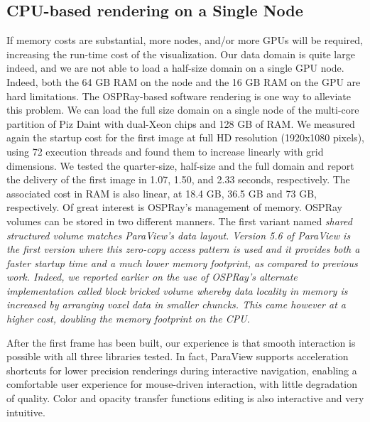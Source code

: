 \documentclass[5p,times]{elsarticle}
\begin{document}
\subsection{CPU-based rendering on a Single Node}
If memory costs are substantial, more nodes, and/or more GPUs will be required,
increasing the run-time cost of the visualization. Our data domain is quite large
indeed, and we are not able to load a half-size domain on a single GPU node. Indeed, both
the 64 GB RAM on the node and the 16 GB RAM on the GPU are hard limitations.
The OSPRay-based software rendering is one way to alleviate this problem. We can load the full size
domain on a single node of  the multi-core partition of Piz Daint with dual-Xeon
chips and 128 GB of RAM. We measured again the startup cost for the first image
at full HD resolution (1920x1080 pixels),
using 72 execution threads and found them to increase linearly with grid dimensions.
We tested the quarter-size, half-size and the full domain and report the delivery
of the first image in 1.07, 1.50, and 2.33 seconds, respectively. The associated cost
in RAM is also linear, at 18.4 GB, 36.5 GB and 73 GB, respectively. Of great interest
is OSPRay's management of memory. OSPRay volumes can be stored in two different manners.
The first variant named \it{shared structured volume} \rm matches ParaView's data layout.
Version 5.6 of ParaView is the first version where this zero-copy access pattern is used
and it provides both a faster startup time and a much lower memory footprint, as compared
to previous work. Indeed, we reported earlier on
the use of OSPRay's alternate implementation called \it{block bricked volume} \rm whereby
data locality in memory is increased by arranging voxel data in smaller chuncks. This came
however at a higher cost, doubling the memory footprint on the CPU\cite{SC18ThermalConvection}. 
 
After the first frame has been built, our experience is that smooth interaction
is possible with all three libraries tested. In fact, ParaView supports acceleration
shortcuts for lower precision renderings during interactive navigation,
enabling a comfortable user experience for mouse-driven interaction,
with little degradation of quality. 
Color and opacity transfer functions editing is also interactive and very intuitive.
\end{document}
